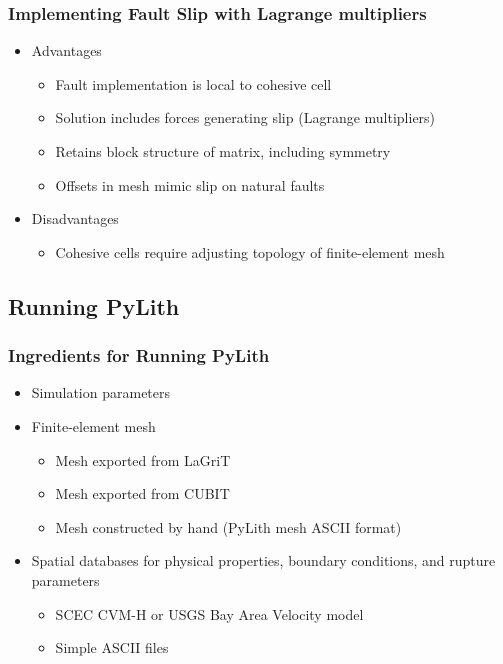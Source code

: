 \documentclass{beamer}
\begin{document}
\begin{frame}
  \frametitle{Implementing Fault Slip with Lagrange multipliers}
 
 \begin{itemize}
 \item Advantages
   \begin{itemize}
   \item Fault implementation is local to cohesive cell
   \item Solution includes forces generating slip (Lagrange multipliers)
   \item Retains block structure of matrix, including symmetry
   \item Offsets in mesh mimic slip on natural faults
   \end{itemize}
 \item Disadvantages 
   \begin{itemize}
   \item Cohesive cells require adjusting topology of finite-element mesh
  \end{itemize}
 \end{itemize}
  
\end{frame}


\subsection{Running PyLith}

\begin{frame}
  \frametitle{Ingredients for Running PyLith}

  \begin{itemize}
  \item Simulation parameters
  \item Finite-element mesh
    \begin{itemize}
    \item Mesh exported from LaGriT
    \item Mesh exported from CUBIT
    \item Mesh constructed by hand (PyLith mesh ASCII format)
    \end{itemize}
  \item Spatial databases for physical properties, boundary
    conditions, and rupture parameters
    \begin{itemize}
    \item SCEC CVM-H or USGS Bay Area Velocity model
    \item Simple ASCII files
    \end{itemize}
  \end{itemize}

\end{frame}
\end{document}

